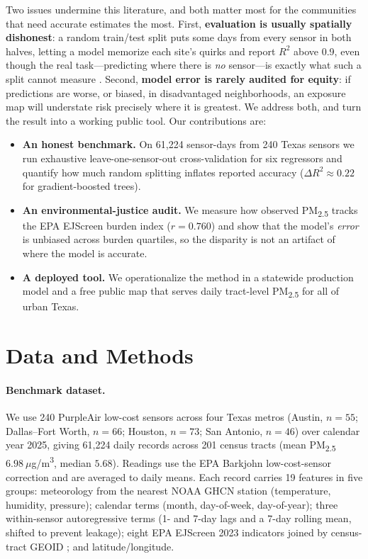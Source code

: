 \documentclass{article}
\begin{document}
Two issues undermine this literature, and both matter most for the communities that need accurate estimates the most. First, \textbf{evaluation is usually spatially dishonest}: a random train/test split puts some days from every sensor in both halves, letting a model memorize each site's quirks and report $R^2$ above 0.9, even though the real task---predicting where there is \emph{no} sensor---is exactly what such a split cannot measure \citep{roberts2017cross, meyer2019importance}. Second, \textbf{model error is rarely audited for equity}: if predictions are worse, or biased, in disadvantaged neighborhoods, an exposure map will understate risk precisely where it is greatest. We address both, and turn the result into a working public tool. Our contributions are:
\begin{itemize}[leftmargin=1.4em, itemsep=0.1em, topsep=0.2em]
\item \textbf{An honest benchmark.} On 61{,}224 sensor-days from 240 Texas sensors we run exhaustive leave-one-sensor-out cross-validation for six regressors and quantify how much random splitting inflates reported accuracy ($\Delta R^2 \approx 0.22$ for gradient-boosted trees).
\item \textbf{An environmental-justice audit.} We measure how observed PM\textsubscript{2.5} tracks the EPA EJScreen burden index ($r{=}0.760$) and show that the model's \emph{error} is unbiased across burden quartiles, so the disparity is not an artifact of where the model is accurate.
\item \textbf{A deployed tool.} We operationalize the method in a statewide production model and a free public map that serves daily tract-level PM\textsubscript{2.5} for all of urban Texas.
\end{itemize}

\section{Data and Methods}
\label{sec:methods}

\paragraph{Benchmark dataset.} We use 240 PurpleAir low-cost sensors across four Texas metros (Austin, $n{=}55$; Dallas--Fort Worth, $n{=}66$; Houston, $n{=}73$; San Antonio, $n{=}46$) over calendar year 2025, giving 61{,}224 daily records across 201 census tracts (mean PM\textsubscript{2.5} $6.98~\mu$g/m\textsuperscript{3}, median $5.68$). Readings use the EPA Barkjohn low-cost-sensor correction \citep{barkjohn2021} and are averaged to daily means. Each record carries 19 features in five groups: meteorology from the nearest NOAA GHCN station \citep{menne2012ghcn} (temperature, humidity, pressure); calendar terms (month, day-of-week, day-of-year); three within-sensor autoregressive terms (1- and 7-day lags and a 7-day rolling mean, shifted to prevent leakage); eight EPA EJScreen 2023 indicators joined by census-tract GEOID \citep{epa2022ejscreen}; and latitude/longitude.
\end{document}
